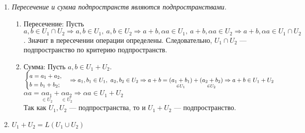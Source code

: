 \begin{enumerate}
	\item \textit{Пересечение и сумма подпространств являются подпространствами.}\begin{Proof}
		\begin{enumerate}
			\item Пересечение: Пусть $a,b \in U_1 \cap U_2\Rightarrow a,b \in U_1,\ a,b\in U_2\Rightarrow a+b, \alpha a \in U_1,\ a+b, \alpha a \in U_2\Rightarrow a+b, \alpha a\in U_1 \cap U_2$. Значит в пересечении операции определены. Следовательно, $U_1 \cap U_2$ --- подпространство по критерию подпространств.
			\item Сумма: Пусть $a,b \in U_1 + U_2$.\\
			$\begin{cases}
				a = a_1 + a_2,\\
				b = b_1 + b_2;
			\end{cases}\Rightarrow a_1,b_1 \in U_1,\ a_2,b_2 \in U_2\Rightarrow\\ a + b = \underset{\in U_1}{(a_1 + b_1)} + \underset{\in U_2}{(a_2 + b_2)} \Rightarrow a + b \in U_1 + U_2$\\
			$\alpha a = \underset{\in U_2}{\alpha a_1} + \underset{\in U_2}{\alpha a_2} \Rightarrow \alpha a\in U_1 + U_2$\\
			Так как $U_1, U_2$ --- подпространства, то и $U_1 + U_2$ --- подпространство.
		\end{enumerate}
	\end{Proof}
	\item $U_1 + U_2 = L(U_1 \cup U_2)$
	

\end{enumerate}

